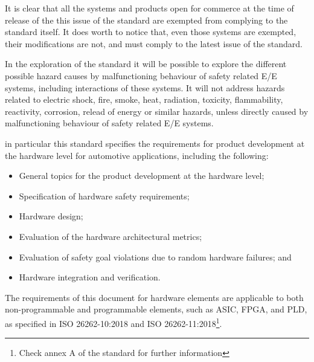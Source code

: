 \documentclass[./dissertation.tex]{subfiles}
\begin{document}
It is clear that all the systems and products open for commerce at the time of release of the this issue of the standard are exempted from complying to the standard itself. It does worth to notice that, even those systems are exempted, their modifications are not, and must comply to the latest issue of the standard.

In the exploration of the standard it will be possible to explore the different possible hazard causes by malfunctioning behaviour of safety related E/E systems, including interactions of these systems. It will not address hazards related to electric shock, fire, smoke, heat, radiation, toxicity, flammability, reactivity, corrosion, relead of energy or similar hazards, unless directly caused by malfunctioning behaviour of safety related E/E systems.

in particular this standard specifies the requirements for product development at the hardware level for automotive applications, including the following:
\begin{itemize}
\item General topics for the product development at the hardware level;
\item Specification of hardware safety requirements;
\item Hardware design;
\item Evaluation of the hardware architectural metrics;
\item Evaluation of safety goal violations due to random hardware failures; and
\item Hardware integration and verification.
\end{itemize}
The requirements of this document for hardware elements are applicable to both non-programmable and programmable elements, such as ASIC, FPGA, and PLD, as specified in ISO 26262-10:2018 and ISO 26262-11:2018\footnote{Check annex A of the standard for further information}.
\end{document}
